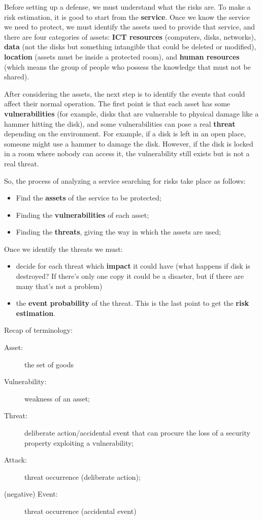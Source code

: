 Before setting up a defense, we must understand what the risks are. To make a risk estimation, it is good to start from the \textbf{service}. Once we know the service we need to protect, we must identify the assets used to provide that service, and there are four categories of assets: \textbf{ICT resources} (computers, disks, networks), \textbf{data} (not the disks but something intangible that could be deleted or modified), \textbf{location} (assets must be inside a protected room), and \textbf{human resources} (which means the group of people who possess the knowledge that must not be shared).

After considering the assets, the next step is to identify the events that could affect their normal operation. The first point is that each asset has some \textbf{vulnerabilities} (for example, disks that are vulnerable to physical damage like a hammer hitting the disk), and some vulnerabilities can pose a real \textbf{threat} depending on the environment. For example, if a disk is left in an open place, someone might use a hammer to damage the disk. However, if the disk is locked in a room where nobody can access it, the vulnerability still exists but is not a real threat.

\vspace{5mm}
So, the process of analyzing a service searching for risks take place as follows:
\begin{itemize}
  \item Find the \textbf{assets} of the service to be protected;
  \item Finding the \textbf{vulnerabilities} of each asset;
  \item Finding the \textbf{threats}, giving the way in which the assets are used;
\end{itemize}

\vspace{5mm}
Once we identify the threats we must:
\begin{itemize}
  \item decide for each threat which \textbf{impact} it could have (what happens if disk is destroyed? If there's only one copy it could be a disaster, but if there are many that's not a problem)
  \item the \textbf{event probability} of the threat. This is the last point to get the \textbf{risk estimation}.
\end{itemize}

\bigskip
Recap of terminology:
\begin{description}
  \item[Asset:] the set of goods
  \item[Vulnerability:] weakness of an asset;
  \item[Threat:] deliberate action/accidental event that can procure the loss of a security property exploiting a vulnerability;
  \item[Attack:] threat occurrence (deliberate action);
  \item[(negative) Event:] threat occurrence (accidental event)
\end{description}


